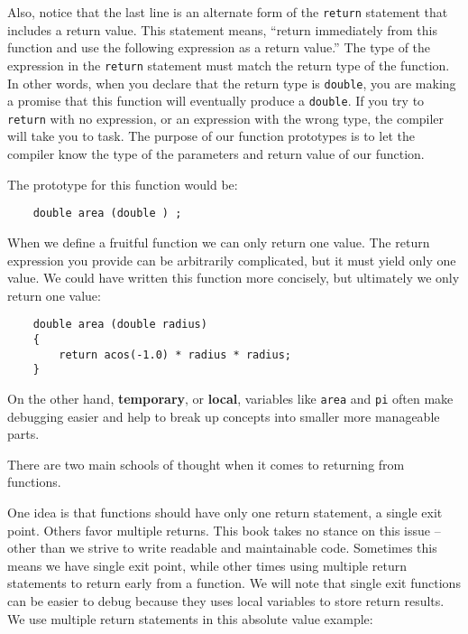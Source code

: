 Also, notice that the last line is an alternate form of the
{\tt return} statement that includes a return value.  This
statement means, ``return immediately from this function and
use the following expression as a return value.'' The type of the expression in
the {\tt return} statement must match the return type of the function.
In other words, when you declare that the return type is {\tt double},
you are making a promise that this function will eventually
produce a {\tt double}.  If you try to {\tt return} with no
expression, or an expression with the wrong type, the compiler will
take you to task. The purpose of our function prototypes is to
let the compiler know the type of the parameters and return value of our function.
 
The prototype for this function would be:

\begin{verbatim}
	double area (double ) ;
\end{verbatim}
%

When we define a fruitful function we can only return one value. The return
expression you provide can be arbitrarily complicated, but it must yield only one value. 
We could have written this function more concisely, but ultimately we only return one value:

\begin{verbatim}
	double area (double radius) 
	{
		return acos(-1.0) * radius * radius;
	}
\end{verbatim}
%

On the other hand, {\bf temporary}, or {\bf local}, variables like {\tt area} and {\tt pi} often
make debugging easier and help to break up concepts into smaller more manageable parts.

There are two main schools of thought when it comes to returning from functions.

One idea is that functions should have only one return statement, a single exit point. 
Others favor multiple returns. This book takes no stance on this issue -- other than we 
strive to write readable and maintainable code. Sometimes this means we have single exit point, 
while other times using multiple return statements to return early from a function.
We will note that single exit functions can be easier to debug because they
uses local variables to store return results.
We use multiple return statements in this absolute value example:

